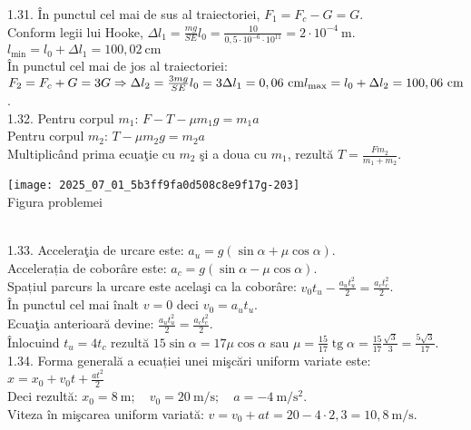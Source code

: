 1.31. În punctul cel mai de sus al traiectoriei, $F_{1}=F_{c}-G=G$.\\ Conform legii lui Hooke, $\Delta l_{1}=\frac{m g}{S E} l_{0}=\frac{10}{0,5 \cdot 10^{-6} \cdot 10^{11}}=2 \cdot 10^{-4} \mathrm{~m}$.\\ $l_{\min }=l_{0}+\Delta l_{1}=100,02 \mathrm{~cm}$\\ În punctul cel mai de jos al traiectoriei:\\ $F_{2}=F_{c}+G=3 G \Rightarrow \Delta l_{2}=\frac{3 m g}{S E} l_{0}=3 \Delta l_{1}=0,06 \mathrm{~cm}\\ l_{\max }=l_{0}+\Delta l_{2}=100,06 \mathrm{~cm}$.\\

1.32. Pentru corpul $m_{1}$: $F-T-\mu m_{1} g=m_{1} a$\\ Pentru corpul $m_{2}$: $T-\mu m_{2} g=m_{2} a$\\ Multiplicând prima ecuaţie cu $m_{2}$ şi a doua cu $m_{1}$, rezultă $T=\frac{F m_{2}}{m_{1}+m_{2}}$.\\ \begin{center} \texttt{[image: 2025\_07\_01\_5b3ff9fa0d508c8e9f17g-203]}\\ Figura problemei \end{center}\\

1.33. Acceleraţia de urcare este: $a_{u}=g(\sin \alpha+\mu \cos \alpha)$.\\ Accelerația de coborâre este: $a_{c}=g(\sin \alpha-\mu \cos \alpha)$.\\ Spațiul parcurs la urcare este acelaşi ca la coborâre: $v_{0} t_{u}-\frac{a_{u} t_{u}^{2}}{2}=\frac{a_{c} t_{c}^{2}}{2}$.\\ În punctul cel mai înalt $v=0$ deci $v_{0}=a_{u} t_{u}$.\\ Ecuaţia anterioară devine: $\frac{a_{u} t_{u}^{2}}{2}=\frac{a_{c} t_{c}^{2}}{2}$.\\ Înlocuind $t_{u}=4 t_{c}$ rezultă $15 \sin \alpha=17 \mu \cos \alpha$ sau $\mu=\frac{15}{17} \operatorname{tg} \alpha=\frac{15}{17} \frac{\sqrt{3}}{3}=\frac{5 \sqrt{3}}{17}$.\\

1.34. Forma generală a ecuației unei mişcări uniform variate este:\\ $x=x_{0}+v_{0} t+\frac{a t^{2}}{2}$\\ Deci rezultă: $x_{0}=8 \mathrm{~m}; \quad v_{0}=20 \mathrm{~m} / \mathrm{s}; \quad a=-4 \mathrm{~m} / \mathrm{s}^{2}$.\\ Viteza în mişcarea uniform variată: $v=v_{0}+a t=20-4 \cdot 2,3=10,8 \mathrm{~m} / \mathrm{s}$.\\

